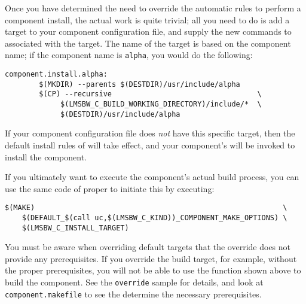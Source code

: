Once you have determined the need to override the automatic rules to
perform a component install, the actual work is quite trivial; all you
need to do is add a \makefile target to your component configuration
file, and supply the new commands to associated with the target.  The
name of the target is based on the component name; if the component
name is \texttt{alpha}, you would do the following:


\begin{small}
\begin{verbatim}
component.install.alpha:
        $(MKDIR) --parents $(DESTDIR)/usr/include/alpha
        $(CP) --recursive                                  \
             $(LMSBW_C_BUILD_WORKING_DIRECTORY)/include/*  \
             $(DESTDIR)/usr/include/alpha
\end{verbatim}
\end{small}

If your component configuration file does \emph{not} have this
specific target, then the default install rules of \lmsbw will take
effect, and your component's \makefile will be invoked to install the
component.

If you ultimately want to execute the component's actual build
process, you can use the same code of \lmsbw proper to initiate this
by executing:

\begin{footnotesize}
\begin{verbatim}
$(MAKE)                                                          \
    $(DEFAULT_$(call uc,$(LMSBW_C_KIND))_COMPONENT_MAKE_OPTIONS) \
    $(LMSBW_C_INSTALL_TARGET)
\end{verbatim}
\end{footnotesize}


You must be aware when overriding default targets that the override
does not provide any prerequisites.  If you override the build target,
for example, without the proper prerequisites, you will not be able to
use the function shown above to build the component.  See the
\texttt{override} sample for details, and look at
\texttt{component.makefile} to see the determine the necessary
prerequisites.


